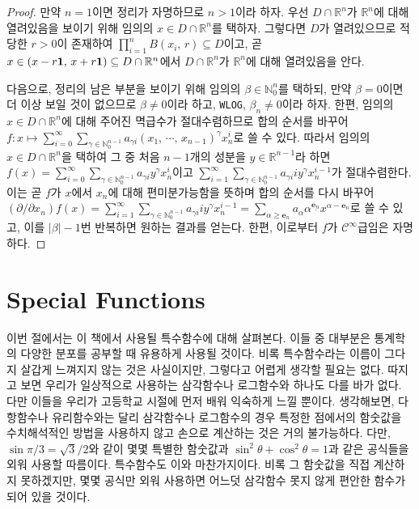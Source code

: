 \begin{proof}
    만약 $n=1$이면 정리가 자명하므로 $n>1$이라 하자. 우선 $D\cap\mathbb{R}^n$가 $\mathbb{R}^n$에 대해 열려있음을 보이기 위해 임의의 $x\in D\cap\mathbb{R}^n$를 택하자. 그렇다면 $D$가 열려있으므로 적당한 $r>0$이 존재하여 $\prod_{i=1}^nB(x_i,\,r)\subseteq D$이고, 곧 $x\in(x-r\mathbf{1},\,x+r\mathbf{1})\subseteq D\cap\mathbb{R}^n$에서 $D\cap\mathbb{R}^n$가 $\mathbb{R}^n$에 대해 열려있음을 안다.

    다음으로, 정리의 남은 부분을 보이기 위해 임의의 $\beta\in\mathbb{N}_0^n$를 택하되, 만약 $\beta=0$이면 더 이상 보일 것이 없으므로 $\beta\ne0$이라 하고, \texttt{WLOG}, $\beta_n\ne0$이라 하자. 한편, 임의의 $x\in D\cap\mathbb{R}^n$에 대해 주어진 멱급수가 절대수렴하므로 합의 순서를 바꾸어 $f:x\mapsto\sum_{i=0}^\infty\sum_{\gamma\in\mathbb{N}_0^{n-1}}a_{\gamma i}(x_1,\,\cdots,\,x_{n-1})^\gamma x_n^i$로 쓸 수 있다. 따라서 임의의 $x\in D\cap\mathbb{R}^n$을 택하여 그 중 처음 $n-1$개의 성분을 $y\in\mathbb{R}^{n-1}$라 하면 $f(x)=\sum_{i=0}^\infty\sum_{\gamma\in\mathbb{N}_0^{n-1}}a_{\gamma i}y^\gamma x_n^i$이고 $\sum_{i=1}^\infty\sum_{\gamma\in\mathbb{N}_0^{n-1}}a_{\gamma i}iy^\gamma x_n^{i-1}$가 절대수렴한다. 이는 곧 $f$가 $x$에서 $x_n$에 대해 편미분가능함을 뜻하며 합의 순서를 다시 바꾸어 $(\partial/\partial x_n)f(x)=\sum_{i=1}^\infty\sum_{\gamma\in\mathbb{N}_0^{n-1}}a_{\gamma i}iy^\gamma x_n^{i-1}=\sum_{\alpha\geq\mathbf{e}_n}a_\alpha\alpha^{\underline{\mathbf{e}_n}}x^{\alpha-\mathbf{e}_n}$로 쓸 수 있고, 이를 $|\beta|-1$번 반복하면 원하는 결과를 얻는다. 한편, 이로부터 $f$가 $\mathcal{C}^\infty$급임은 자명하다.
\end{proof}

\section{Special Functions}

이번 절에서는 이 책에서 사용될 특수함수에 대해 살펴본다. 이들 중 대부분은 통계학의 다양한 분포를 공부할 때 유용하게 사용될 것이다. 비록 특수함수라는 이름이 그다지 살갑게 느껴지지 않는 것은 사실이지만, 그렇다고 어렵게 생각할 필요는 없다. 따지고 보면 우리가 일상적으로 사용하는 삼각함수나 로그함수와 하나도 다를 바가 없다. 다만 이들을 우리가 고등학교 시절에 먼저 배워 익숙하게 느낄 뿐이다. 생각해보면, 다항함수나 유리함수와는 달리 삼각함수나 로그함수의 경우 특정한 점에서의 함숫값을 수치해석적인 방법을 사용하지 않고 손으로 계산하는 것은 거의 불가능하다. 다만, $\sin\pi/3=\sqrt{3}/2$와 같이 몇몇 특별한 함숫값과 $\sin^2\theta+\cos^2\theta=1$과 같은 공식들을 외워 사용할 따름이다. 특수함수도 이와 마찬가지이다. 비록 그 함숫값을 직접 계산하지 못하겠지만, 몇몇 공식만 외워 사용하면 어느덧 삼각함수 못지 않게 편안한 함수가 되어 있을 것이다.

